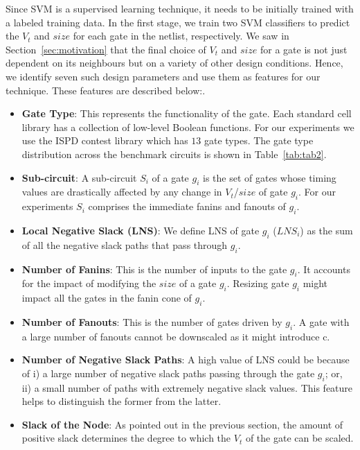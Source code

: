  
Since SVM is a supervised learning technique, it needs to be initially trained with a labeled training data. In the first stage, we train two SVM classifiers to predict the $V_t$ and $size$ for each gate in the netlist, respectively. 
\noindent We saw in Section~\ref{sec:motivation} that the final choice of $V_t$ and $size$ for a gate is not just dependent on its neighbours but on a variety of other design conditions. Hence, we identify seven such design parameters and use them as features for our technique. These features are described below:.
\begin{itemize}
    \item\textbf{  Gate Type}: This represents the functionality of the gate. Each standard cell library has a collection of low-level Boolean functions. For our experiments we use the ISPD contest library which has $13$ gate types. The gate type distribution across the benchmark circuits is shown in Table~\ref{tab:tab2}. 
 \item\textbf{ Sub-circuit}: A sub-circuit $S_i$ of a gate $g_i$ is the set of gates whose timing values are drastically affected by any change in $V_t$/$size$ of gate $g_i$.  For our experiments $S_i$ comprises the immediate fanins and fanouts of $g_i$.
 \item\textbf{ Local Negative Slack (LNS)}: We define LNS of gate $g_i$ ($LNS_i$) as the sum of all the negative slack paths that pass through $g_i$.
 \item\textbf{ Number of Fanins}: This is the number of inputs to the gate $g_i$. It accounts for the impact of modifying the $size$ of a gate $g_i$. Resizing gate $g_i$ might impact all the gates in the fanin cone of $g_i$.
 \item\textbf{ Number of Fanouts}: This is the number of gates driven by $g_i$. A gate with a large number of fanouts cannot be downscaled as it might introduce c.
 \item\textbf{  Number of Negative Slack Paths}: A high value of LNS could be because of i) a large number of negative slack paths passing through the gate $g_i$; or, ii) a small number of paths with extremely negative slack values. This feature helps to distinguish the former from the latter. 
 \item\textbf{ Slack of the Node}: As pointed out in the previous section, the amount of positive slack determines the degree to which the $V_t$ of the gate can be scaled.

\end{itemize}

